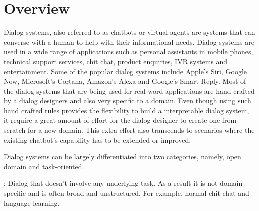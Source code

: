 \section{Overview}
Dialog systems, also referred to as chatbots or virtual agents are systems that can converse with a human to help with their informational needs. Dialog systems are used in a wide range of applications such as personal assistants in mobile phones, technical support services, chit chat, product enquiries, IVR systems and entertainment. Some of the popular dialog systems include Apple's Siri, Google Now, Microsoft's Cortana, Amazon's Alexa and Google's Smart Reply. Most of the dialog systems that are being used for real word applications are hand crafted by a dialog designers and also very specific to a domain. Even though using such hand crafted rules provides the flexibility to build a interpretable dialog system, it require a great amount of effort for the dialog designer to create one from scratch for a new domain. This extra effort also transcends to scenarios where the existing chatbot's capability has to be extended or improved.


Dialog systems can be largely differentiated into two categories, namely, open domain and task-oriented.

: Dialog that doesn't involve any underlying task. As a result it is not domain specific and is often broad and unstructured. For example, normal chit-chat and language learning.


